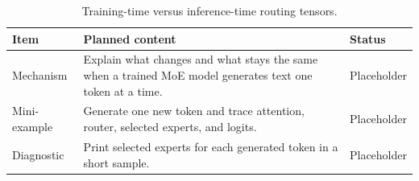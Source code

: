 \begin{table}[H]
\centering
\caption{Training-time versus inference-time routing tensors.}
\label{tab:ch12-autoregressive-inference-with-sparse-ffns}
\begin{tabularx}{\textwidth}{p{}X p{}}
\toprule
Item & Planned content & Status \\
\midrule
Mechanism & Explain what changes and what stays the same when a trained MoE model generates text one token at a time. & Placeholder \\
Mini-example & Generate one new token and trace attention, router, selected experts, and logits. & Placeholder \\
Diagnostic & Print selected experts for each generated token in a short sample. & Placeholder \\
\bottomrule
\end{tabularx}
\end{table}
